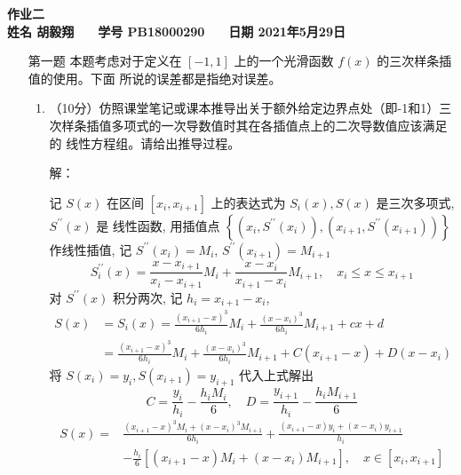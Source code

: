 \documentclass[12pt,a4paper,UTF8]{ctexart}
\theoremstyle{nonumberplain}
\begin{document}


\begin{center}
    \textbf{作业二}\\
    \textbf{姓名 胡毅翔 ~~ 学号 PB18000290 ~~ 日期 2021年5月29日}\\
\end{center}

\begin{center}
    \fbox{
        \begin{minipage}{40em}
            \vspace{5cm}
            \hspace{20cm}
        \end{minipage}}
\end{center}
\vspace{1cm}

\begin{enumerate}
    \item[第一题] 本题考虑对于定义在 $[-1,1]$ 上的一个光滑函数 $f(x)$ 的三次样条插值的使用。下面 所说的误差都是指绝对误差。
    \begin{enumerate}\item（10分）仿照课堂笔记或课本推导出关于额外给定边界点处（即-1和1）三
    次样条插值多项式的一次导数值时其在各插值点上的二次导数值应该满足的
    线性方程组。请给出推导过程。
    \par 解：
    \par 记 $S(x)$ 在区间 $\left[x_{i}, x_{i+1}\right]$ 上的表达式为 $S_{i}(x), S(x)$ 是三次多项式, $S^{\prime \prime}(x)$ 是 线性函数, 用插值点 $\left\{\left(x_{i}, S^{\prime \prime}\left(x_{i}\right)\right),\left(x_{i+1}, S^{\prime \prime}\left(x_{i+1}\right)\right)\right\}$ 作线性插值, 记 $S^{\prime \prime}\left(x_{i}\right)=M_{i}$,
    $S^{\prime \prime}\left(x_{i+1}\right)=M_{i+1}$
    $$
    S_{i}^{\prime \prime}(x)=\frac{x-x_{i+1}}{x_{i}-x_{i+1}} M_{i}+\frac{x-x_{i}}{x_{i+1}-x_{i}} M_{i+1}, \quad x_{i} \leqslant x \leqslant x_{i+1}
    $$
    对 $S^{\prime \prime}(x)$ 积分两次, 记 $h_{i}=x_{i+1}-x_{i}$,
    $$
    \begin{aligned}
    S(x) &=S_{i}(x)=\frac{\left(x_{i+1}-x\right)^{3}}{6 h_{i}} M_{i}+\frac{\left(x-x_{i}\right)^{3}}{6 h_{i}} M_{i+1}+c x+d \\
    &=\frac{\left(x_{i+1}-x\right)^{3}}{6 h_{i}} M_{i}+\frac{\left(x-x_{i}\right)^{3}}{6 h_{i}} M_{i+1}+C\left(x_{i+1}-x\right)+D\left(x-x_{i}\right)
    \end{aligned}
    $$
    将 $S\left(x_{i}\right)=y_{i}, S\left(x_{i+1}\right)=y_{i+1}$ 代入上式解出
    $$
    C=\frac{y_{i}}{h_{i}}-\frac{h_{i} M_{i}}{6}, \quad D=\frac{y_{i+1}}{h_{i}}-\frac{h_{i} M_{i+1}}{6}
    $$
    \begin{equation}\label{eq1}
    \begin{aligned}
S(x)=& \frac{\left(x_{i+1}-x\right)^{3} M_{i}+\left(x-x_{i}\right)^{3} M_{i+1}}{6 h_{i}}+\frac{\left(x_{i+1}-x\right) y_{i}+\left(x-x_{i}\right) y_{i+1}}{h_{i}} \\
&-\frac{h_{i}}{6}\left[\left(x_{i+1}-x\right) M_{i}+\left(x-x_{i}\right) M_{i+1}\right], \quad x \in\left[x_{i}, x_{i+1}\right]
\end{aligned}\end{equation}


\end{enumerate}
\end{enumerate}
\end{document}
